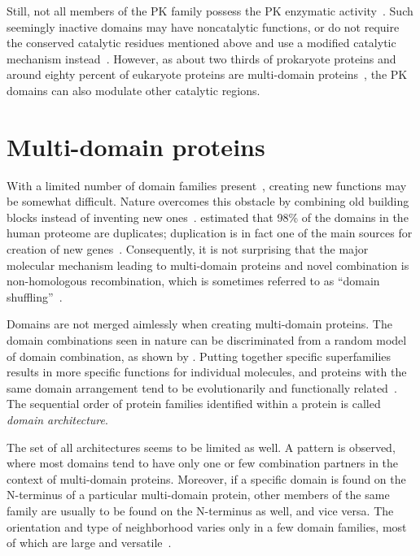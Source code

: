   Still, not all members of the PK family possess the PK enzymatic
  activity~\cite{zervas2002integrin, morrison2001ksr, kroiher2001deceiving}.
  Such seemingly inactive domains may have noncatalytic functions, or do not require the
  conserved catalytic residues mentioned above and use a modified catalytic mechanism
  instead~\cite{manning2002protein}.
  However, as about two thirds of prokaryote proteins and around eighty percent of
  eukaryote proteins are multi-domain
  proteins~\cite{teichmann1998structural, gerstein1998representative}, the PK domains
  can also modulate other catalytic regions.

\section{Multi-domain proteins}
\label{intro:multi}

  With a limited number of domain families
  present~\cite{chothia1992one, wolf2000estimating}, creating new functions may be
  somewhat difficult.
  Nature overcomes this obstacle by combining old building blocks instead of inventing new
  ones~\cite{apic2001insight}.
  \citet{muller2002structural} estimated that 98\% of the domains in the human proteome
  are duplicates; duplication is in fact one of the main sources for creation of new
  genes~\cite{lynch2000evolutionary}.
  Consequently, it is not surprising that the major molecular mechanism leading to
  multi-domain proteins and novel combination is non-homologous recombination, which is
  sometimes referred to as ``domain shuffling''~\cite{vogel2004structure}.

  Domains are not merged aimlessly when creating multi-domain proteins.
  The domain combinations seen in nature can be discriminated from a random model of
  domain combination, as shown by \citet{apic2003multi}.
  Putting together specific superfamilies results in more specific functions for
  individual molecules, and proteins with the same domain arrangement tend to be
  evolutionarily and functionally
  related~\cite{hegyi2001annotation, bashton2002geometry, vogel2004structure}.
  The sequential order of protein families identified within a protein is called
  \emph{domain architecture}.

  The set of all architectures seems to be limited as well.
  A pattern is observed, where most domains tend to have only one or few
  combination partners in the context of multi-domain proteins.
  Moreover, if a specific domain is found on the N-terminus of a particular multi-domain
  protein, other members of the same family are usually to be found on the N-terminus as
  well, and vice versa.
  The orientation and type of neighborhood varies only in a few domain families, most of
  which are large and versatile~\cite{apic2001domain, apic2001insight}.

